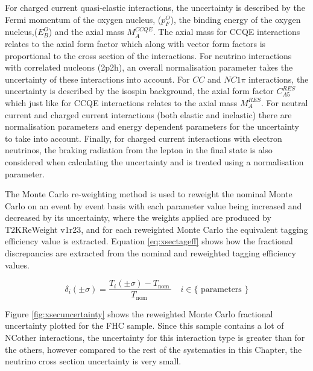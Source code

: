 For charged current quasi-elastic interactions, the uncertainty is described by the Fermi momentum of the oxygen nucleus, ($p_{F}^{O}$), the binding energy of the oxygen nucleus,($E_{B}^{O}$) and the axial mass $M_{A}^{C C Q E}$. The axial mass for CCQE interactions relates to the axial form factor which along with vector form factors is proportional to the cross section of the interactions. For neutrino interactions with correlated nucleons (2p2h), an overall normalisation parameter takes the uncertainty of these interactions into account. For $CC$ and $NC1\pi$ interactions, the uncertainty is described by the isospin background, the axial form factor $C_{A 5}^{R E S}$ which just like for CCQE interactions relates to the axial mass $M_{A}^{R E S}$. For neutral current and charged current interactions (both elastic and inelastic) there are normalisation parameters and energy dependent parameters for the uncertainty to take into account. Finally, for charged current interactions with electron neutrinos, the braking radiation from the lepton in the final state is also considered when calculating the uncertainty and is treated using a normalisation parameter.
\newline

The Monte Carlo re-weighting method is used to reweight the nominal Monte Carlo on an event by event basis with each parameter value being increased and decreased by its uncertainty, where the weights applied are produced by T2KReWeight v1r23, and for each reweighted Monte Carlo the equivalent tagging efficiency value is extracted. Equation \ref{eq:xsectageff} shows how the fractional discrepancies are extracted from the nominal and reweighted tagging efficiency values.

\begin{equation}
\delta_{i}(\pm \sigma)=\frac{T_{i}(\pm \sigma)-T_{\text {nom }}}{T_{\text {nom }}} \quad i \in\{\text { parameters }\}
\label{eq:xsectageff}
\end{equation}

Figure \ref{fig:xsecuncertainty} shows the reweighted Monte Carlo fractional uncertainty plotted for the FHC sample. Since this sample contains a lot of NCother interactions, the uncertainty for this interaction type is greater than for the others, however compared to the rest of the systematics in this Chapter, the neutrino cross section uncertainty is very small.

